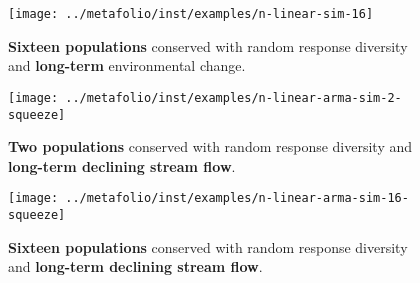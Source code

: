 \clearpage

\begin{figure}[htbp]
\centering
\texttt{[image: ../metafolio/inst/examples/n-linear-sim-16]}
\caption{\textbf{Sixteen populations} conserved with random response diversity
and \textbf{long-term} environmental change.}
\label{f:eg-n-linear-sixteen}
\end{figure}

\clearpage

\begin{figure}[htbp]
\centering
\texttt{[image: ../metafolio/inst/examples/n-linear-arma-sim-2-squeeze]}
\caption{\textbf{Two populations} conserved with random response diversity
and \textbf{long-term declining stream flow}.}
\label{f:eg-n-squeeze-two}
\end{figure}

\clearpage

\begin{figure}[htbp]
\centering
\texttt{[image: ../metafolio/inst/examples/n-linear-arma-sim-16-squeeze]}
\caption{\textbf{Sixteen populations} conserved with random response diversity
and \textbf{long-term declining stream flow}.}
\label{f:eg-n-squeeze-twelve}
\end{figure}
